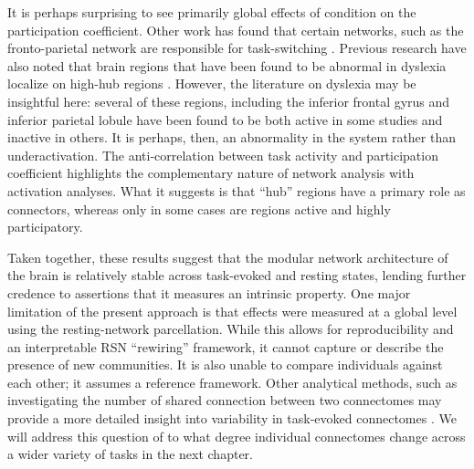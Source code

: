 It is perhaps surprising to see primarily global effects of condition on the participation coefficient. Other work has found that certain networks, such as the fronto-parietal network are responsible for task-switching \citep{Cole2013}. Previous research have also noted that brain regions that have been found to be abnormal in dyslexia localize on high-hub regions \citep{Bailey2018}. However, the literature on dyslexia may be insightful here: several of these regions, including the inferior frontal gyrus and inferior parietal lobule have been found to be both active in some studies and inactive in others. It is perhaps, then, an abnormality in the system rather than underactivation. The anti-correlation between task activity and participation coefficient highlights the complementary nature of network analysis with activation analyses. What it suggests is that ``hub'' regions have a primary role as connectors, whereas only in some cases are regions active and highly participatory. 

Taken together, these results suggest that the modular network architecture of the brain is relatively stable across task-evoked and resting states, lending further credence to assertions that it measures an intrinsic property. One major limitation of the present approach is that effects were measured at a global level using the resting-network parcellation. While this allows for reproducibility and an interpretable RSN ``rewiring'' framework, it cannot capture or describe the presence of new communities. It is also unable to compare individuals against each other; it assumes a reference framework. Other analytical methods, such as investigating the number of shared connection between two connectomes may provide a more detailed insight into variability in task-evoked connectomes \citep{Petersen2016}. We will address this question of to what degree individual connectomes change across a wider variety of tasks in the next chapter.
